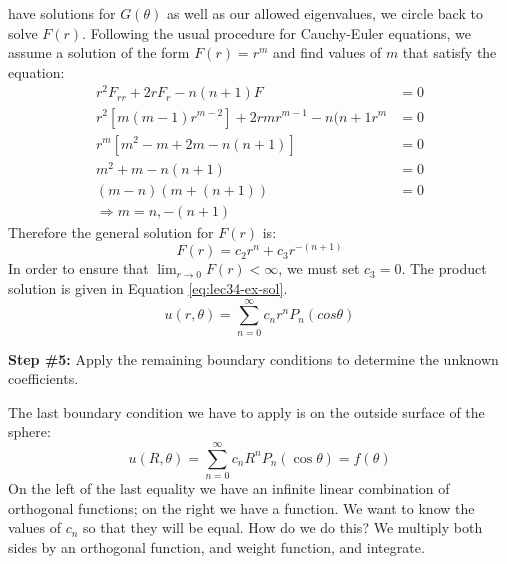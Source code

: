  have solutions for $G(\theta)$ as well as our allowed eigenvalues, we circle back to solve $F(r)$.  Following the usual procedure for Cauchy-Euler equations, we assume a solution of the form $F(r)=r^m$ and find values of $m$ that satisfy the equation:
\begin{align*}
r^2F_{rr} + 2rF_r - n(n+1)F &= 0 \\
r^2\left[m(m-1)r^{m-2}\right]+2rmr^{m-1}-n(n+1r^m &= 0 \\
r^m\left[m^2-m+2m-n(n+1) \right] &= 0 \\
m^2+m-n(n+1) &= 0 \\
(m-n)(m+(n+1)) &= 0 \\
\Rightarrow m = n, -(n+1)
\end{align*}
Therefore the general solution for $F(r)$ is:
\begin{equation*}
F(r) = c_2r^n + c_3r^{-(n+1)}
\end{equation*}
In order to ensure that $\lim_{r \to 0} F(r)<\infty$, we must set $c_3 = 0$.  The product solution is given in Equation \ref{eq:lec34-ex-sol}. 
\begin{equation}
u(r,\theta) = \sum\limits_{n=0}^{\infty} c_n r^nP_n(cos{\theta})
\label{eq:lec34-ex-sol}
\end{equation}

\vspace{0.25cm}

\noindent\textbf{Step \#5:} Apply the remaining boundary conditions to determine the unknown coefficients.

\vspace{0.25cm}

\noindent The last boundary condition we have to apply is on the outside surface of the sphere:
\begin{equation*}
u(R,\theta) = \sum\limits_{n=0}^{\infty}c_n R^n P_n(\cos{\theta}) = f(\theta)
\end{equation*}
On the left of the last equality we have an infinite linear combination of orthogonal functions; on the right we have a function.  We want to know the values of $c_n$ so that they will be equal.  How do we do this?  We multiply both sides by an orthogonal function, and weight function, and integrate.

